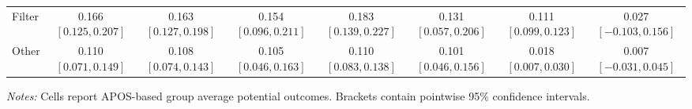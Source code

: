 \begin{table}[p]
\begin{adjustbox}{max width=\linewidth, center}
\begin{tabular}{lccccccc}
Filter & 0.166 {\scriptsize$[0.125,0.207]$} & 0.163 {\scriptsize$[0.127,0.198]$} & 0.154 {\scriptsize$[0.096,0.211]$} & 0.183 {\scriptsize$[0.139,0.227]$} & 0.131 {\scriptsize$[0.057,0.206]$} & 0.111 {\scriptsize$[0.099,0.123]$} & 0.027 {\scriptsize$[-0.103,0.156]$} \\
Other & 0.110 {\scriptsize$[0.071,0.149]$} & 0.108 {\scriptsize$[0.074,0.143]$} & 0.105 {\scriptsize$[0.046,0.163]$} & 0.110 {\scriptsize$[0.083,0.138]$} & 0.101 {\scriptsize$[0.046,0.156]$} & 0.018 {\scriptsize$[0.007,0.030]$} & 0.007 {\scriptsize$[-0.031,0.045]$} \\
\bottomrule
\end{tabular}
\end{adjustbox}
\par\vspace{3pt}
\begin{minipage}{\linewidth}\footnotesize \textit{Notes:} Cells report APOS-based group average potential outcomes. Brackets contain pointwise 95\% confidence intervals.\end{minipage}
\end{table}
